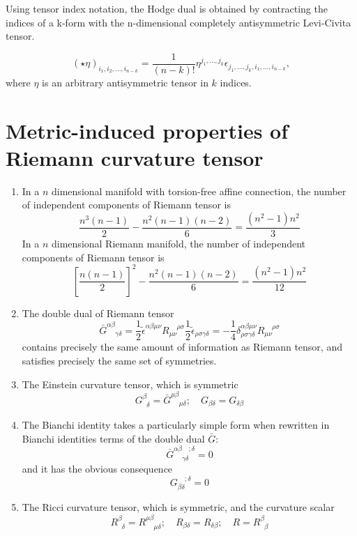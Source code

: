 \noindent
Using tensor index notation, the Hodge dual is obtained by contracting the indices of a k-form with the n-dimensional completely antisymmetric Levi-Civita tensor.\\

\begin{newprop}
\[(\star \eta )_{i_{1},i_{2},\ldots ,i_{n-k}}={\frac {1}{(n-k)!}}\eta ^{j_{1},\ldots ,j_{k}} \epsilon _{j_{1},\ldots ,j_{k},i_{1},\ldots ,i_{n-k}},\]
where $\eta$ is an arbitrary antisymmetric tensor in $k$ indices. 
\end{newprop}

\section{Metric-induced properties of Riemann curvature tensor}
\begin{enumerate}
\item In a $n$ dimensional manifold with torsion-free affine connection, the number of independent components of Riemann tensor is \[\frac{n^3(n-1)}{2} - \frac{n^2(n-1)(n-2)}{6} = \frac{(n^2-1)n^2}{3}\]
In a $n$ dimensional Riemann manifold,  the number of independent components of Riemann tensor is \[\left[\frac{n(n-1)}{2}\right]^2 -\frac{n^2(n-1)(n-2)}{6} = \frac{(n^2-1)n^2}{12} \]
\item  The double dual of Riemann tensor
\[\bar{G}^{\alpha \beta}_{\phantom{\alpha \beta} \gamma \delta} = \frac{1}{2} \tilde{\epsilon}^{\alpha \beta \mu \nu} R_{\mu \nu}^{\phantom{\mu \nu} \rho \sigma} \frac{1}{2} \tilde{\epsilon}_{\rho \sigma \gamma \delta} = -\frac{1}{4} \delta^{\alpha \beta \mu \nu}_{\rho \sigma \gamma \delta} R_{\mu \nu}^{\phantom{\mu \nu} \rho \sigma} \]
contains precisely the same amount of information as
Riemann tensor, and satisfies precisely the same set of symmetries.
\item The Einstein curvature tensor, which is symmetric
\[G^{\beta}_{\phantom{\beta}\delta} = \bar{G}^{\mu \beta}_{\phantom{\mu \beta} \mu \delta}; \quad G_{\beta \delta}=G_{\delta \beta}\]
\item The Bianchi identity takes a particularly simple form when rewritten in Bianchi identities terms of the double dual $\bar{G}$:
\[\bar{G}^{\alpha \beta \phantom{\gamma \delta};\delta}_{\phantom{\alpha \beta} \gamma \delta} = 0\]
and it has the obvious consequence
\[G_{\beta \delta}^{\phantom{\beta \delta};\delta} = 0\]
\item The Ricci curvature tensor, which is symmetric, and the curvature scalar
\[R^{\beta}_{\phantom{\beta}\delta} = R^{\mu \beta}_{\phantom{\mu \beta} \mu \delta}; \quad R_{\beta \delta}=R_{\delta \beta};\quad R = R^{\beta}_{\phantom{\beta}\beta}\]

\end{enumerate}
